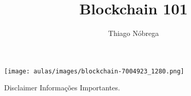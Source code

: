 \documentclass{beamer}
\title{Blockchain 101}
\author{Thiago Nóbrega \and \github{https://github.com/thiagonobrega}}
\date{} %
\begin{document}
\begin{frame}
  \titlepage
  \begin{center}
        \texttt{[image: aulas/images/blockchain-7004923\_1280.png]}
    \end{center}
\end{frame}










\begin{frame}{Disclaimer}
Informações Importantes.
\end{frame}
\end{document}

